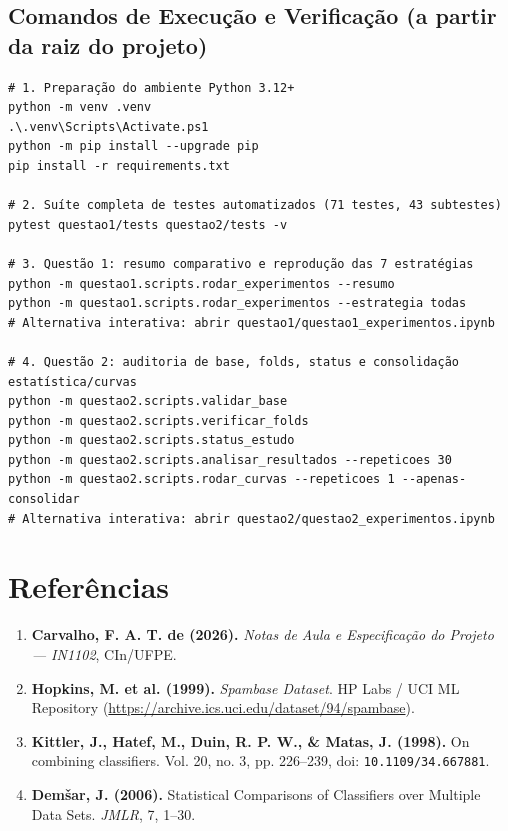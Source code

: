 \documentclass[a4paper,11pt]{article}
\begin{document}
\subsection{Comandos de Execução e Verificação (a partir da raiz do projeto)}\label{sec:4-2-comandos-de-execucao-e-verificacao-a-partir-da-raiz-do-projeto}


\begin{lstlisting}
# 1. Preparação do ambiente Python 3.12+
python -m venv .venv
.\.venv\Scripts\Activate.ps1
python -m pip install --upgrade pip
pip install -r requirements.txt

# 2. Suíte completa de testes automatizados (71 testes, 43 subtestes)
pytest questao1/tests questao2/tests -v

# 3. Questão 1: resumo comparativo e reprodução das 7 estratégias
python -m questao1.scripts.rodar_experimentos --resumo
python -m questao1.scripts.rodar_experimentos --estrategia todas
# Alternativa interativa: abrir questao1/questao1_experimentos.ipynb

# 4. Questão 2: auditoria de base, folds, status e consolidação estatística/curvas
python -m questao2.scripts.validar_base
python -m questao2.scripts.verificar_folds
python -m questao2.scripts.status_estudo
python -m questao2.scripts.analisar_resultados --repeticoes 30
python -m questao2.scripts.rodar_curvas --repeticoes 1 --apenas-consolidar
# Alternativa interativa: abrir questao2/questao2_experimentos.ipynb
\end{lstlisting}



\section{Referências}\label{sec:5-referencias}


\begin{enumerate}[leftmargin=1.5em, itemsep=0.25em, topsep=0.25em]
  \item \textbf{Carvalho, F. A. T. de (2026).} \textit{Notas de Aula e Especificação do Projeto --- IN1102}, CIn/UFPE.
  \item \textbf{Hopkins, M. et al. (1999).} \textit{Spambase Dataset}. HP Labs / UCI ML Repository (\url{https://archive.ics.uci.edu/dataset/94/spambase}).
  \item \textbf{Kittler, J., Hatef, M., Duin, R. P. W., \& Matas, J. (1998).} On combining classifiers. Vol. 20, no. 3, pp. 226--239, doi: \texttt{10.1109/34.667881}.
  \item \textbf{Demšar, J. (2006).} Statistical Comparisons of Classifiers over Multiple Data Sets. \textit{JMLR}, 7, 1--30.
\end{enumerate}
\end{document}
